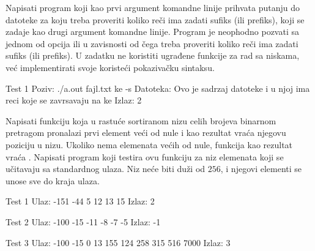 \begin{Exercise}[label=307]
Napisati program koji kao prvi argument komandne linije prihvata
putanju do datoteke za koju treba proveriti koliko reči ima
zadati sufiks (ili prefiks), koji se zadaje kao drugi argument
komandne linije. Program je neophodno pozvati sa jednom od opcija
 ili  u zavisnosti od čega treba proveriti
koliko reči ima zadati sufiks (ili prefiks). U zadatku ne
koristiti ugrađene funkcije za rad sa niskama, već
implementirati svoje koristeći pokazivačku sintaksu.

\begin{miditest}
\begin{test}{Test 1}
Poziv:    ./a.out fajl.txt ke -s
Datoteka: Ovo je sadrzaj datoteke 
          i u njoj ima reci koje se 
          zavrsavaju na ke
Izlaz:    2
\end{test}
\end{miditest}
\end{Exercise}
\begin{Answer}[ref=307]
\end{Answer}



\begin{Exercise}[label=310]
Napisati funkciju koja u rastuće sortiranom nizu celih brojeva
binarnom pretragom pronalazi prvi element veći od nule i kao
rezultat vraća njegovu poziciju u nizu. Ukoliko nema elemenata
većih od nule, funkcija kao rezultat vraća . Napisati
program koji testira ovu funkciju za niz elemenata koji se
učitavaju sa standardnog ulaza. Niz neće biti duži od
$256$, i njegovi elementi se unose sve do kraja ulaza.

\begin{minitest}
\begin{test}{Test 1}
Ulaz:  -151 -44 5 
       12 13 15
Izlaz: 2
\end{test}
\end{minitest}
\begin{minitest}
\begin{test}{Test 2}
Ulaz:  -100 -15 -11 
       -8 -7 -5
Izlaz: -1
\end{test}
\end{minitest}
\begin{minitest}
\begin{test}{Test 3}
Ulaz:  -100 -15 0 13 
       155 124 258 
       315 516 7000
Izlaz: 3
\end{test}
\end{minitest}
\end{Exercise}
\begin{Answer}[ref=310]
\end{Answer}


